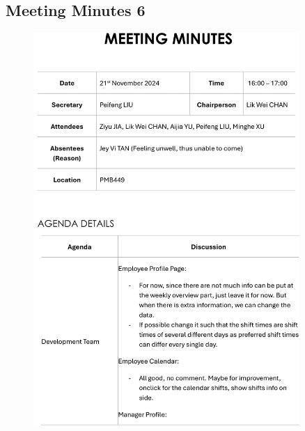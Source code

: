 \documentclass[a4paper,12pt, oneside]{report}
\begin{document}
\begin{appendices}
\section{Meeting Minutes 6}
\begin{figure}[H]
    \centering
    \includegraphics[width=0.9\textwidth]{Minutes/Minutes_6-cropped-1.png}
\end{figure}
\newpage
\begin{figure}[H]
    \centering

\end{figure}
\end{appendices}
\end{document}
